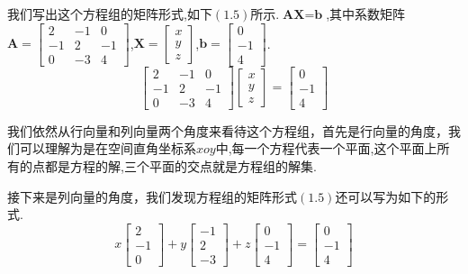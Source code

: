 \documentclass[oneside]{book}
\begin{document}
	我们写出这个方程组的矩阵形式,如下$(1.5) $所示.$ \textbf{AX}=\textbf{b} $,其中系数矩阵$\textbf{A}=\left[
	\begin{array}{ccc}
		2 & -1 & 0\\
		-1 & 2 & -1\\
		0 & -3 & 4
	\end{array}
	\right]$,$ \textbf{X}= \left[\begin{array}{c}
		x\\
		y\\
		z
	\end{array}
	\right]
	$,$ \textbf{b}=\left[\begin{array}{c}
		0\\
		-1\\
		4
	\end{array}
	\right] $.
	\begin{equation}
		\left[
		\begin{array}{ccc}
			2 & -1 & 0\\
			-1 & 2 & -1\\
			0 & -3 & 4
		\end{array}
		\right]
		\left[
		\begin{array}{c}
			x\\
			y\\
			z
		\end{array}
		\right]
		=
		\left[
		\begin{array}{c}
			0\\
			-1\\
			4
		\end{array}
		\right]
	\end{equation}
	
	我们依然从行向量和列向量两个角度来看待这个方程组，首先是行向量的角度，我们可以理解为是在空间直角坐标系$ xoy $中,每一个方程代表一个平面,这个平面上所有的点都是方程的解,三个平面的交点就是方程组的解集.
	
	接下来是列向量的角度，我们发现方程组的矩阵形式$(1.5)$还可以写为如下的形式.
	\begin{equation}
		x\left[
		\begin{array}{c}
			2 \\
			-1 \\
			0
		\end{array}
		\right]
		+
		y\left[
		\begin{array}{c}
			-1\\
			2 \\
			-3
		\end{array}
		\right]
		+
		z\left[
		\begin{array}{c}
			0\\
			-1 \\
			4
		\end{array}
		\right]
		=
		\left[
		\begin{array}{c}
			0\\
			-1\\
			4
		\end{array}
		\right]
	\end{equation}
\end{document}
